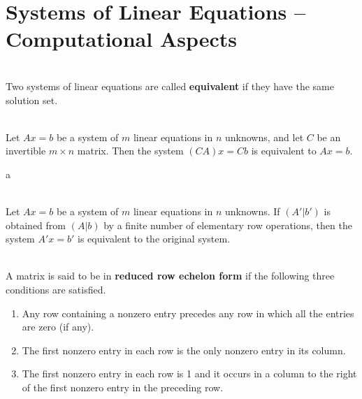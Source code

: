 \section{Systems of Linear Equations -- Computational Aspects}

\begin{definition}
	\hfill\\
	Two systems of linear equations are called \textbf{equivalent} if they have the same solution set.
\end{definition}

\begin{theorem}
	\hfill\\
	Let $Ax = b$ be a system of $m$ linear equations in $n$ unknowns, and let $C$ be an invertible $m \times n$ matrix. Then the system $(CA)x = Cb$ is equivalent to $Ax = b$.
\end{theorem}a

\begin{corollary}
	\hfill\\
	Let $Ax = b$ be a system of $m$ linear equations in $n$ unknowns. If $(A'|b')$ is obtained from $(A|b)$ by a finite number of elementary row operations, then the system $A'x = b'$ is equivalent to the original system.
\end{corollary}

\begin{definition}
	\hfill\\
	A matrix is said to be in \textbf{reduced row echelon form} if the following three conditions are satisfied.
	
	\begin{enumerate}
		\item Any row containing a nonzero entry precedes any row in which all the entries are zero (if any).
		
		\item The first nonzero entry in each row is the only nonzero entry in its column.
		
		\item The first nonzero entry in each row is 1 and it occurs in a column to the right of the first nonzero entry in the preceding row.
	\end{enumerate}
\end{definition}


